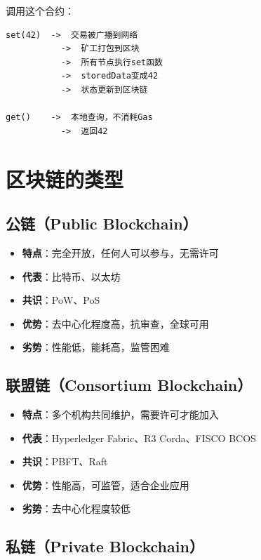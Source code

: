﻿\documentclass[12pt,a4paper]{article}
\begin{document}
调用这个合约：
\begin{lstlisting}
set(42)  ->  交易被广播到网络
           ->  矿工打包到区块
           ->  所有节点执行set函数
           ->  storedData变成42
           ->  状态更新到区块链

get()    ->  本地查询，不消耗Gas
           ->  返回42
\end{lstlisting}

\section{区块链的类型}

\subsection{公链（Public Blockchain）}

\begin{itemize}[leftmargin=1.5em]
\item \textbf{特点}：完全开放，任何人可以参与，无需许可
\item \textbf{代表}：比特币、以太坊
\item \textbf{共识}：PoW、PoS
\item \textbf{优势}：去中心化程度高，抗审查，全球可用
\item \textbf{劣势}：性能低，能耗高，监管困难
\end{itemize}

\subsection{联盟链（Consortium Blockchain）}

\begin{itemize}[leftmargin=1.5em]
\item \textbf{特点}：多个机构共同维护，需要许可才能加入
\item \textbf{代表}：Hyperledger Fabric、R3 Corda、FISCO BCOS
\item \textbf{共识}：PBFT、Raft
\item \textbf{优势}：性能高，可监管，适合企业应用
\item \textbf{劣势}：去中心化程度较低
\end{itemize}

\subsection{私链（Private Blockchain）}
\end{document}

